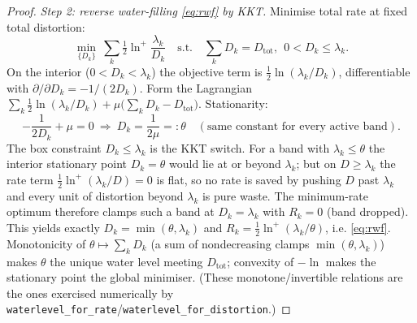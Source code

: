 \begin{proof}
\medskip
\noindent\emph{Step 2: reverse water-filling \eqref{eq:rwf} by KKT.}
Minimise total rate at fixed total distortion:
\[
\min_{\{D_k\}}\ \sum_k \tfrac12\ln^{+}\!\frac{\lambda_k}{D_k}
\quad\text{s.t.}\quad \sum_k D_k=D_{\mathrm{tot}},\ \ 0<D_k\le\lambda_k .
\]
On the interior ($0<D_k<\lambda_k$) the objective term is $\tfrac12\ln(\lambda_k/D_k)$, differentiable with $\partial/\partial D_k=-1/(2D_k)$. Form the Lagrangian $\sum_k\tfrac12\ln(\lambda_k/D_k)+\mu\big(\sum_kD_k-D_{\mathrm{tot}}\big)$. Stationarity:
\[
-\frac{1}{2D_k}+\mu=0\ \Longrightarrow\ D_k=\frac{1}{2\mu}=:\theta\quad(\text{same constant for every active band}).
\]
The box constraint $D_k\le\lambda_k$ is the KKT switch. For a band with $\lambda_k\le\theta$ the interior stationary point $D_k=\theta$ would lie at or beyond $\lambda_k$; but on $D\ge\lambda_k$ the rate term $\tfrac12\ln^{+}(\lambda_k/D)=0$ is flat, so no rate is saved by pushing $D$ past $\lambda_k$ and every unit of distortion beyond $\lambda_k$ is pure waste. The minimum-rate optimum therefore clamps such a band at $D_k=\lambda_k$ with $R_k=0$ (band dropped). This yields exactly $D_k=\min(\theta,\lambda_k)$ and $R_k=\tfrac12\ln^{+}(\lambda_k/\theta)$, i.e. \eqref{eq:rwf}. Monotonicity of $\theta\mapsto\sum_kD_k$ (a sum of nondecreasing clamps $\min(\theta,\lambda_k)$) makes $\theta$ the unique water level meeting $D_{\mathrm{tot}}$; convexity of $-\ln$ makes the stationary point the global minimiser. (These monotone/invertible relations are the ones exercised numerically by \texttt{waterlevel\_for\_rate}/\texttt{waterlevel\_for\_distortion}.)


\end{proof}
